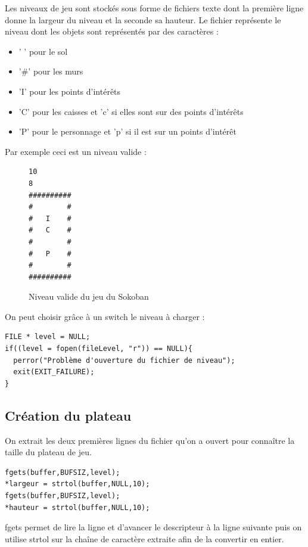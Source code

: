 \documentclass{article}
\begin{document}
Les niveaux de jeu sont stockés sous forme de fichiers texte dont la première ligne donne la largeur du niveau et la seconde sa hauteur.
Le fichier représente le niveau dont les objets sont représentés par des caractères :
\begin{itemize}
  \item ' ' pour le sol
  \item '\#' pour les murs
  \item 'I' pour les points d'intérêts
  \item 'C' pour les caisses et 'c' si elles sont sur des points d'intérêts
  \item 'P' pour le personnage et 'p' si il est sur un points d'intérêt
\end{itemize}

Par exemple ceci est un niveau valide :

\begin{figure}[H]
  \begin{BVerbatim}
10
8
##########
#        #
#   I    #
#   C    #
#        #
#   P    #
#        #
##########
  \end{BVerbatim}
\caption{Niveau valide du jeu du Sokoban}
\end{figure}

On peut choisir grâce à un switch le niveau à charger :

\begin{verbatim}
FILE * level = NULL;
if((level = fopen(fileLevel, "r")) == NULL){
  perror("Problème d'ouverture du fichier de niveau");
  exit(EXIT_FAILURE);
}
\end{verbatim}

\subsection{Création du plateau}

On extrait les deux premières lignes du fichier qu'on a ouvert pour connaître la taille du plateau de jeu.

\begin{verbatim}
fgets(buffer,BUFSIZ,level);
*largeur = strtol(buffer,NULL,10);
fgets(buffer,BUFSIZ,level);
*hauteur = strtol(buffer,NULL,10);
\end{verbatim}

fgets permet de lire la ligne et d'avancer le descripteur à la ligne suivante puis on utilise strtol sur la chaîne de caractère extraite afin de la convertir en entier.
\\
\end{document}
